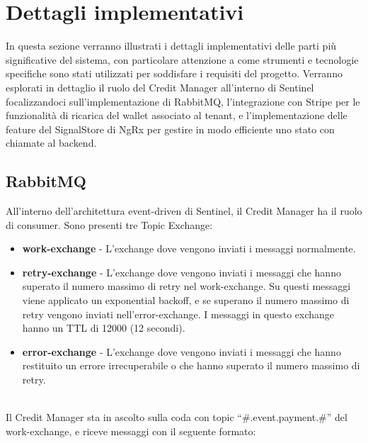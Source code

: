\chapter{Dettagli implementativi}
In questa sezione verranno illustrati i dettagli implementativi delle parti più significative del sistema, con particolare attenzione a come strumenti
e tecnologie specifiche sono stati utilizzati per soddisfare i requisiti del progetto. Verranno esplorati in dettaglio il ruolo del Credit Manager all'interno di Sentinel
focalizzandoci sull'implementazione di RabbitMQ, l'integrazione con Stripe per le funzionalità di ricarica del wallet associato al tenant, e l'implementazione delle feature del
SignalStore di NgRx per gestire in modo efficiente uno stato con chiamate al backend.

\section{RabbitMQ}
All'interno dell'architettura event-driven di Sentinel, il Credit Manager ha il ruolo di consumer.
Sono presenti tre Topic Exchange:
\begin{itemize}
  \item \textbf{work-exchange} - L'exchange dove vengono inviati i messaggi normalmente.
  \item \textbf{retry-exchange} - L'exchange dove vengono inviati i messaggi che hanno superato il numero massimo di retry nel work-exchange.
    Su questi messaggi viene applicato un exponential backoff, e se superano il numero massimo di retry vengono inviati nell'error-exchange. I messaggi in questo
    exchange hanno un TTL di 12000 (12 secondi).
  \item \textbf{error-exchange} - L'exchange dove vengono inviati i messaggi che hanno restituito un errore irrecuperabile o che hanno superato il numero massimo di retry.
\end{itemize}
\textbf{}\\
Il Credit Manager sta in ascolto sulla coda con topic ``\#.event.payment.\#'' del work-exchange, e riceve messaggi con il seguente formato:

